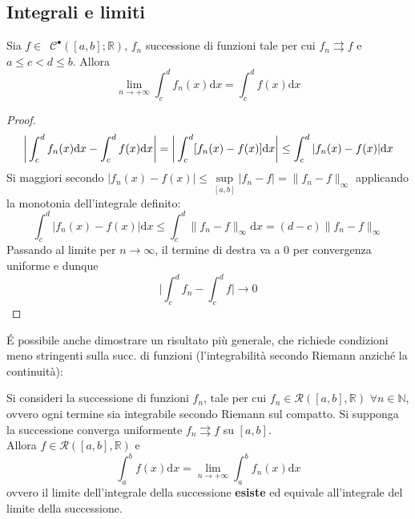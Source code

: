\documentclass[10pt]{article}
\theoremstyle{plain}
\begin{document}
\subsection{Integrali e limiti}
\begin{ther}
Sia $f \in \enspace \mathcal{C}^{•}([a,b] ; \mathbb{R})$, $f_n$ successione di funzioni tale per cui $f_n \rightrightarrows f$ e $a \leq c < d \leq b$. Allora
\[\lim\limits_{n \rightarrow +\infty} \int_{c}^{d}f_n(x)\textrm{d}x = \int_{c}^{d}f(x)\textrm{d}x\]
\end{ther}
\begin{proof}
\[\bigg{|}\int_{c}^{d}f_n(x)\textrm{d}x - \int_{c}^{d}f(x)\textrm{d}x\bigg{|} = \bigg{|}\int_{c}^{d}[f_n(x) - f(x)]\textrm{d}x\bigg{|} \leq \int_{c}^{d}|f_n(x) - f(x)|\textrm{d}x\]
Si maggiori secondo $|f_n(x) - f(x)| \leq \sup\limits_{[a,b]}|f_n - f| = \|f_n - f\|_\infty$ applicando la monotonia dell'integrale definito:
\[\int_{c}^{d}|f_n(x) - f(x)|\textrm{d}x \leq \int_{c}^{d}\|f_n - f\|_\infty\textrm{d}x = (d - c)\|f_n - f\|_\infty\]
Passando al limite per $n \rightarrow \infty$, il termine di destra va a $0$ per convergenza uniforme e dunque
\[\bigg|\int_{c}^{d} f_n - \int_{c}^{d} f \bigg| \rightarrow 0\]
\end{proof}
\'E possibile anche dimostrare un risultato più generale, che richiede condizioni meno stringenti sulla succ. di funzioni (l'integrabilità secondo Riemann anziché la continuità):
\begin{ther}
Si consideri la successione di funzioni $f_n$, tale per cui $f_n \in \mathcal{R}([a,b], \mathbb{R})$ $\forall n \in \mathbb{N}$, ovvero ogni termine sia integrabile secondo Riemann sul compatto. Si supponga la successione converga uniformente $f_n \rightrightarrows f$ su $[a,b]$.
\\Allora $f \in \mathcal{R}([a,b], \mathbb{R})$ e 
\[\int_{a}^{b}f(x)\textrm{d}x = \lim\limits_{n \rightarrow +\infty} \int_{a}^{b}f_n(x)\textrm{d}x\]
ovvero il limite dell'integrale della successione \textbf{esiste} ed equivale all'integrale del limite della successione.
\end{ther}
\end{document}
